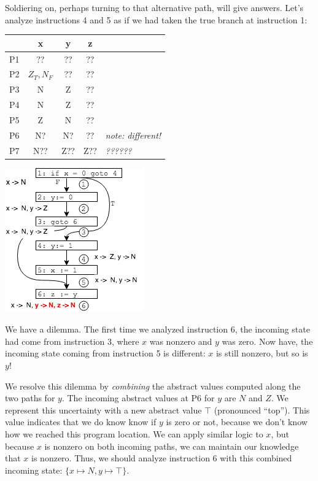 \documentclass[11pt]{article}
\begin{document}
Soldiering on, perhaps turning to that alternative path, will give answers.  
Let's analyze instructions 4 and 5 as if we had taken the
true branch at instruction 1:

\tablespace
\begin{center}
\begin{minipage}[t][-9.7em][b]{0.5\textwidth} %
\begin{tabular}{r | c c c l}
  & x & y & z \\
\hline
P1 & ?? & ??   & ??  \\
P2 & $Z_T,N_F$ & ??  & ??  \\
P3 & N & Z & ??  \\
P4 & N & Z & ??  \\
P5 & Z & N & ??  \\
P6 & N? & N? & ?? &  \textit{note: different!} \\
P7 & N?? & Z?? & Z?? & \textit{??????} \\
\end{tabular}
\end{minipage}
\hspace*{1em}%
\includegraphics[scale=0.8]{images/alternativepathwrong}
\end{center}
\tablespace

We have a dilemma.  The first time we analyzed instruction 6, the incoming state
had come from instruction 3, where $x$ was nonzero and $y$ was zero.  Now have,
the incoming state coming from instruction 5 is different:  $x$ is still nonzero,
but so is $y$!

We resolve this dilemma by \emph{combining} the abstract values computed along the two
paths for $y$. The incoming abstract values at P6 for $y$ are $N$
and $Z$.    We represent this uncertainty
with a new abstract
value $\top$ (pronounced ``top'').  This value indicates that we do know know if $y$ is zero or not,
because we don't know how we reached this program location. 
We can apply similar logic to $x$, but because $x$ is
nonzero on both incoming paths, we can maintain our knowledge that $x$ is
nonzero.  Thus, we should analyze instruction 6 with this combined
incoming state:  $\{x \mapsto N, y \mapsto {\top}\}$.  
\end{document}

